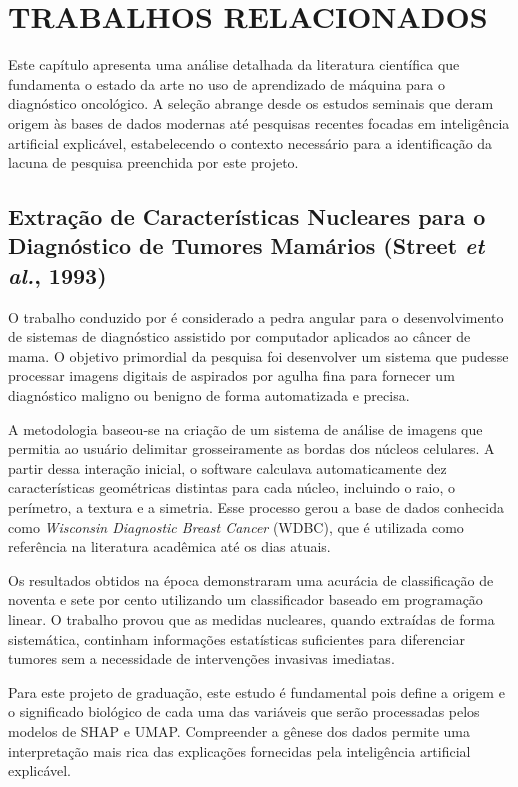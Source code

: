 \documentclass[
    12pt
    ,oneside
    ,a4paper
    ,chapter=TITLE
    ,section=TITLE
    ,sumario=abnt-6027-2012
    ,english,brazil]{abntex2} %
\begin{document}
\chapter{TRABALHOS RELACIONADOS}
\label{cap:trabalhos_relacionados}

Este capítulo apresenta uma análise detalhada da literatura científica que fundamenta o estado da arte no uso de aprendizado de máquina para o diagnóstico oncológico. A seleção abrange desde os estudos seminais que deram origem às bases de dados modernas até pesquisas recentes focadas em inteligência artificial explicável, estabelecendo o contexto necessário para a identificação da lacuna de pesquisa preenchida por este projeto.

\section{Extração de Características Nucleares para o Diagnóstico de Tumores Mamários (Street \textit{et al.}, 1993)}

O trabalho conduzido por  é considerado a pedra angular para o desenvolvimento de sistemas de diagnóstico assistido por computador aplicados ao câncer de mama. O objetivo primordial da pesquisa foi desenvolver um sistema que pudesse processar imagens digitais de aspirados por agulha fina para fornecer um diagnóstico maligno ou benigno de forma automatizada e precisa.

A metodologia baseou-se na criação de um sistema de análise de imagens que permitia ao usuário delimitar grosseiramente as bordas dos núcleos celulares. A partir dessa interação inicial, o software calculava automaticamente dez características geométricas distintas para cada núcleo, incluindo o raio, o perímetro, a textura e a simetria. Esse processo gerou a base de dados conhecida como \textit{Wisconsin Diagnostic Breast Cancer} (WDBC), que é utilizada como referência na literatura acadêmica até os dias atuais.

Os resultados obtidos na época demonstraram uma acurácia de classificação de noventa e sete por cento utilizando um classificador baseado em programação linear. O trabalho provou que as medidas nucleares, quando extraídas de forma sistemática, continham informações estatísticas suficientes para diferenciar tumores sem a necessidade de intervenções invasivas imediatas.

Para este projeto de graduação, este estudo é fundamental pois define a origem e o significado biológico de cada uma das variáveis que serão processadas pelos modelos de SHAP e UMAP. Compreender a gênese dos dados permite uma interpretação mais rica das explicações fornecidas pela inteligência artificial explicável.
\end{document}
